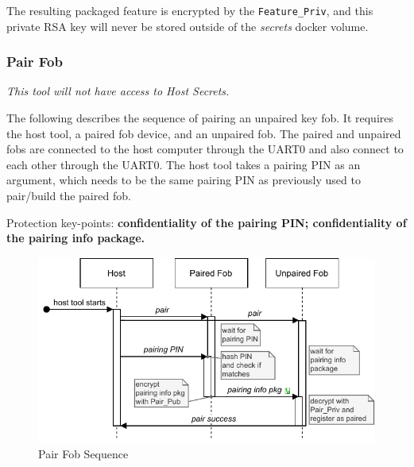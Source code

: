 \documentclass[11pt,oneside,onecolumn,letterpaper]{article}
\begin{document}
The resulting packaged feature is encrypted by the \verb|Feature_Priv|, and this private RSA key will never be stored outside of the \textit{secrets} docker volume.

\subsubsection{Pair Fob}

\textit{This tool will not have access to Host Secrets.}

The following describes the sequence of pairing an unpaired key fob. It requires the host tool, a paired fob device, and an unpaired fob. The paired and unpaired fobs are connected to the host computer through the UART0 and also connect to each other through the UART0. The host tool takes a pairing PIN as an argument, which needs to be the same pairing PIN as previously used to pair/build the paired fob.

Protection key-points: \textbf{confidentiality of the pairing PIN; confidentiality of the pairing info package.}

\begin{figure}[!htbp]
	\begin{centering}
		\includegraphics[width = .6\textwidth]{pic/pair.pdf}
		\caption{Pair Fob Sequence}
		\label{fig:pair}
	\end{centering}
\end{figure}
\end{document}
